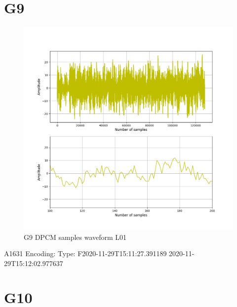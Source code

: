 \documentclass[hidelinks, 12pt, a4paper]{article}
\begin{document}
\section{G9}

\begin{figure}[h!]
\centering
	\includegraphics[height=.38\textheight, width=\textwidth]{assets/session2/g9.png}
	\caption{G9 DPCM samples waveform L01} 
\end{figure}
A1631
Encoding: 
Type: F2020-11-29T15:11:27.391189
2020-11-29T15:12:02.977637

\section{G10}
\end{document}
